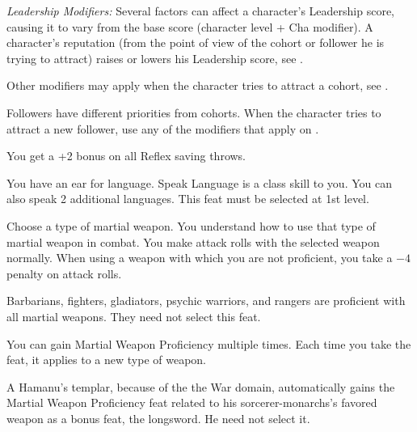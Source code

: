 {\textit{Leadership Modifiers:} Several factors can affect a character's Leadership score, causing it to vary from the base score (character level + Cha modifier). A character's reputation (from the point of view of the cohort or follower he is trying to attract) raises or lowers his Leadership score, see .


Other modifiers may apply when the character tries to attract a cohort, see .


Followers have different priorities from cohorts. When the character tries to attract a new follower, use any of the modifiers that apply on .

}

{You get a +2 bonus on all Reflex saving throws.}

{You have an ear for language.}{}
{Speak Language is a class skill to you. You can also speak 2 additional languages.}{}
{This feat must be selected at 1st level.}

{Choose a type of martial weapon. You understand how to use that type of martial weapon in combat.}
{}
{You make attack rolls with the selected weapon normally.}
{When using a weapon with which you are not proficient, you take a $-4$ penalty on attack rolls.}
{Barbarians, fighters, gladiators, psychic warriors, and rangers are proficient with all martial weapons. They need not select this feat.

You can gain Martial Weapon Proficiency multiple times. Each time you take the feat, it applies to a new type of weapon.

A Hamanu's templar, because of the the War domain, automatically gains the Martial Weapon Proficiency feat related to his sorcerer-monarchs's favored weapon as a bonus feat, the longsword. He need not select it.}

